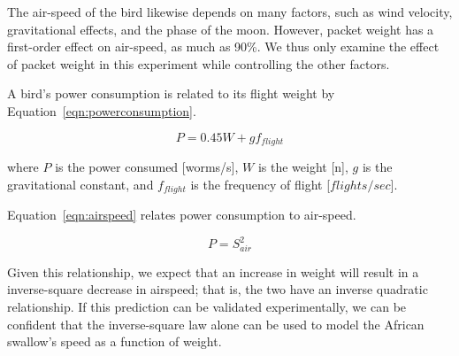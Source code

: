 The air-speed of the bird likewise depends on many factors, such as wind velocity, gravitational effects, and the phase of the moon. However, packet weight has a first-order effect on air-speed, as much as 90\%. We thus only examine the effect of packet weight in this experiment while controlling the other factors.

A bird's power consumption is related to its flight weight by Equation~\ref{eqn:powerconsumption}.

\begin{equation}
\label{eqn:powerconsumption}
P = 0.45 W + g f_{flight}
\end{equation}

where $P$ is the power consumed [worms/s], $W$ is the weight [n], $g$ is the gravitational constant, and $f_{flight}$ is the frequency of flight [$flights/sec$].

Equation~\ref{eqn:airspeed} relates power consumption to air-speed.

\begin{equation}
\label{eqn:airspeed}
P = S_{air}^2
\end{equation}

Given this relationship, we expect that an increase in weight will result in a inverse-square decrease in airspeed; that is, the two have an inverse quadratic relationship. If  this prediction can be validated experimentally, we can be confident that the inverse-square law alone can be used to model the African swallow's speed as a function of weight.

